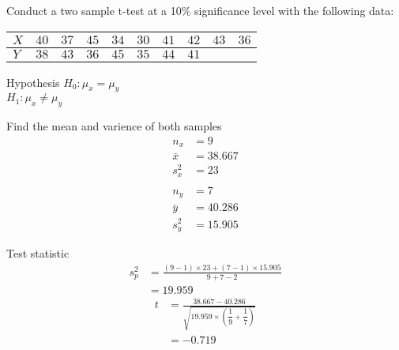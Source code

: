             \begin{example}
            {
                Conduct a two sample t-test at a 10\% significance level with the following data:

                \begin{center}
                \begin{tabular}{l c c c c c c c c c}
                $X$ & $40$ & $37$ & $45$ & $34$ & $30$ & $41$ & $42$ & $43$ & $36$ \\
                \hline
                $Y$ & $38$ & $43$ & $36$ & $45$ & $35$ & $44$ & $41$ \\
                \end{tabular}
                \end{center}
            }

            \begin{step}{Hypothesis}
            $H_0: \mu_x = \mu_y$ \\ 
            $H_1: \mu_x \ne \mu_y$ 
            \end{step}

            \begin{step}{Find the mean and varience of both samples}
            \begin{align*}
            n_x &= 9\\ 
            \bar{x} &= 38.667\\ 
            s_x^2 &= 23
            \\
            \\
            n_y &= 7\\ 
            \bar{y} &= 40.286\\ 
            s_y^2 &= 15.905
            \end{align*}
            \end{step}

            \begin{step}{Test statistic}
            \begin{align*}
            s_p^2 &= \frac{(9 - 1) \times 23 + (7 - 1) \times 15.905}{9 + 7 - 2} \\
                &= 19.959
            \end{align*}
            \begin{align*}
            t &= \frac{38.667-40.286}{\sqrt{19.959 \times \left(\dfrac{1}{9} + \dfrac{1}{7}\right)}} \\
              &= -0.719
            \end{align*}
            \end{step}


\end{example}
